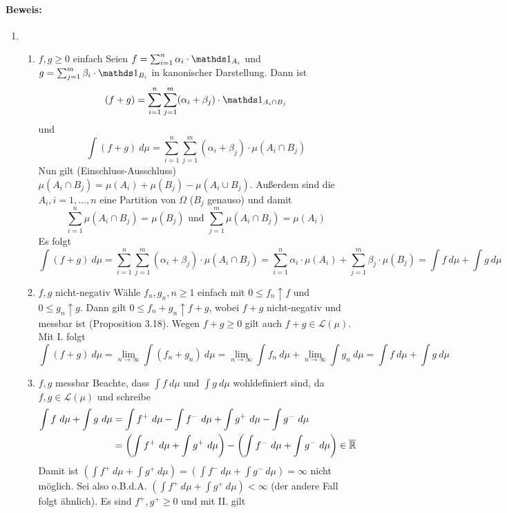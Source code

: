  \paragraph{Beweis:}
 \begin{enumerate}[label=(\roman*)]
     \item
     \begin{enumerate}[label=\Roman*.]
        \item $f,g\geq 0$ einfach\newline
        Seien $f=\sum_{i=1}^n\alpha_i\cdot\ind{A_i}$ und $g=\sum_{j=1}^m\beta_i\cdot\ind{B_i}$ in kanonischer Darstellung. Dann ist
        $$(f+g)=\sum_{i=1}^n\sum_{j=1}^m(\alpha_i+\beta_j)\cdot\ind{A_i\cap B_j}$$
        und 
        $$\int (f+g)\ d\mu=\sum_{i=1}^n\sum_{j=1}^m(\alpha_i+\beta_j)\cdot\mu(A_i\cap B_j)$$
        Nun gilt (Einschluss-Ausschluss) $\mu(A_i\cap B_j)=\mu(A_i)+\mu(B_j)-\mu(A_i\cup B_j)$. Au\ss{}erdem sind die $A_i,i=1,\hdots,n$ eine Partition von $\Omega$ ($B_j$ genauso) und damit  
        $$\sum_{i=1}^n\mu(A_i\cap B_j)=\mu(B_j)\text{ und } \sum_{j=1}^m\mu(A_i\cap B_j)=\mu(A_i)$$
        Es folgt 
        $$\int(f+g)\ d\mu=\sum_{i=1}^n\sum_{j=1}^m(\alpha_i+\beta_j)\cdot\mu(A_i\cap B_j)=\sum_{i=1}^n\alpha_i\cdot\mu(A_i)+\sum_{j=1}^m\beta_j\cdot\mu(B_j)=\int f\ d \mu+\int g\ d\mu$$
        \item $f,g$ nicht-negativ\newline
        W\"ahle $f_n,g_n,n\geq1$ einfach mit $0\leq f_n\uparrow f$ und $0\leq g_n\uparrow g$. Dann gilt $0\leq f_n+g_n\uparrow f+g$, wobei $f+g$ nicht-negativ und messbar ist (Proposition 3.18). Wegen $f+g\geq0$ gilt auch $f+g\in\mathcal{L}(\mu)$. Mit I. folgt
        $$\int (f+g)\ d\mu=\lim_{n\to\infty}\int (f_n+g_n)\ d\mu=\lim_{n\to\infty}\int f_n\ d\mu+\lim_{n\to\infty}\int g_n\ d\mu=\int f\ d\mu+\int g\ d\mu$$
        \item $f,g$ messbar\newline
        Beachte, dass $\int f\ d\mu$ und $\int g\ d\mu$ wohldefiniert sind, da $f,g\in\mathcal{L}(\mu)$ und schreibe
        \begin{align*}
           \int f\ d\mu+\int g\ d\mu&=\int f^+\ d\mu-\int f^-\ d\mu+\int g^+\ d\mu -\int g^-\ d\mu\\
           &=\left(\int f^+\ d\mu+\int g^+\ d\mu\right)-\left(\int f^-\ d\mu+\int g^-\ d\mu\right)\in\overline\R
        \end{align*}
        Damit ist $\left(\int f^+\ d\mu+\int g^+\ d\mu\right)=\left(\int f^-\ d\mu+\int g^-\ d\mu\right)=\infty$ nicht m\"oglich. Sei also o.B.d.A. $\left(\int f^+\ d\mu+\int g^+\ d\mu\right)<\infty$ (der andere Fall folgt \"ahnlich). Es sind $f^+,g^+\geq0$ und mit II. gilt 

\end{enumerate}
\end{enumerate}

